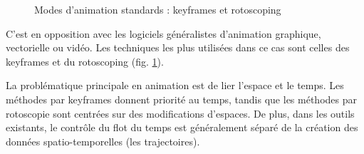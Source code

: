 \documentclass[french,12pt]{article}
\begin{document}
\begin{figure}[h]
\begin{center}

\caption{Modes d'animation standards : keyframes et rotoscoping}
\label{fig.animation}
\end{center}
\end{figure}
C'est en opposition avec les logiciels généralistes d'animation graphique, vectorielle ou vidéo. Les techniques les plus utilisées dans ce cas sont celles des keyframes et du rotoscoping (fig. \ref{fig.animation}).

La problématique principale en animation est de lier l'espace et le temps. Les méthodes par keyframes donnent priorité au temps, tandis que les méthodes par rotoscopie sont centrées sur des modifications d'espaces. De plus, dans les outils existants, le contrôle du flot du temps est généralement séparé de la création des données spatio-temporelles (les trajectoires). 
\end{document}
